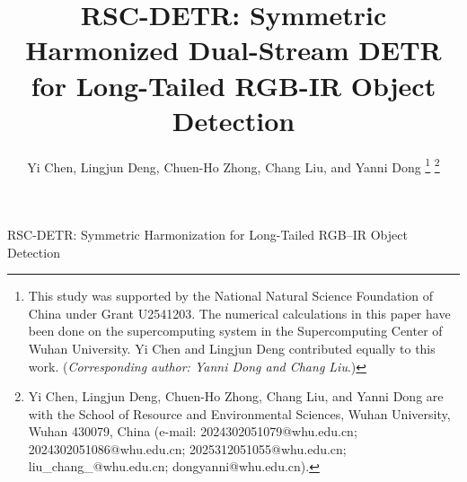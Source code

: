 \documentclass[letterpaper,journal]{IEEEtran}
\begin{document}
\flushbottom

\title{RSC-DETR: Symmetric Harmonized Dual-Stream DETR for Long-Tailed RGB-IR Object Detection}

\author{Yi Chen, Lingjun Deng, Chuen-Ho Zhong, Chang Liu, and Yanni Dong%
\thanks{This study was supported by the National Natural Science Foundation
of China under Grant U2541203. The numerical calculations in this paper have been done on the supercomputing system in the Supercomputing Center of Wuhan University. Yi Chen and Lingjun Deng contributed equally
to this work. (\textit{Corresponding author: Yanni Dong and Chang Liu}.)}%
\thanks{Yi Chen, Lingjun Deng, Chuen-Ho Zhong, Chang Liu, and Yanni Dong are 
with the School of Resource and Environmental Sciences, Wuhan University,
Wuhan 430079, China (e-mail: 2024302051079@whu.edu.cn; 2024302051086@whu.edu.cn; 2025312051055@whu.edu.cn; liu\_chang\_@whu.edu.cn; dongyanni@whu.edu.cn).}}

%
{RSC-DETR: Symmetric Harmonization for Long-Tailed RGB--IR Object Detection}

\maketitle
\end{document}
